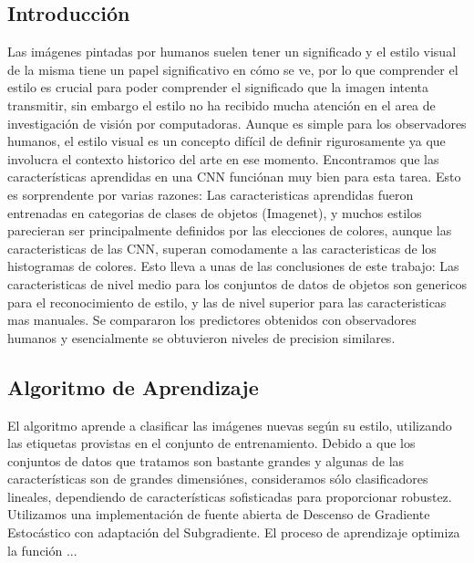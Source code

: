 \documentclass[a4paper,11pt,spanish]{book}
\begin{document}
    \subsection{Introducción}
      Las imágenes pintadas por humanos suelen tener un significado y el estilo visual de la misma tiene un papel significativo en cómo se ve, por lo que comprender
      el estilo es crucial para poder comprender el significado que la imagen intenta transmitir, sin embargo el estilo no ha recibido  mucha atención en el area de investigación de visión por computadoras.
      Aunque es simple para los observadores humanos, el estilo visual es un concepto difícil de definir rigurosamente ya que involucra el contexto historico del arte en ese momento.
      Encontramos que las características aprendidas en una CNN funciónan muy bien para esta tarea. Esto es sorprendente por varias razones: Las caracteristicas aprendidas
      fueron entrenadas en categorias de clases de objetos (Imagenet), y muchos estilos parecieran ser principalmente definidos por las elecciones de colores, aunque
      las caracteristicas de las CNN, superan comodamente a las caracteristicas de los histogramas de colores. Esto lleva a unas de las conclusiones de este trabajo:
      Las caracteristicas de nivel medio para los conjuntos de datos de objetos son genericos para el reconocimiento de estilo, y las de nivel superior para las caracteristicas
      mas manuales.
      Se compararon los predictores obtenidos con observadores humanos y esencialmente se obtuvieron niveles de precision similares. \cite{Karayev:Style_Recognition}
    \subsection{Algoritmo de Aprendizaje}
      El algoritmo aprende a clasificar las imágenes nuevas según su estilo, utilizando las etiquetas provistas en el conjunto de entrenamiento.
      Debido a que los conjuntos de datos que tratamos son bastante grandes y algunas de las características son de grandes dimensiónes, consideramos sólo clasificadores lineales,
      dependiendo de características sofisticadas para proporcionar robustez. Utilizamos una implementación de fuente abierta de Descenso de Gradiente Estocástico con adaptación
      del Subgradiente. El proceso de aprendizaje optimiza la función ...
\end{document}
